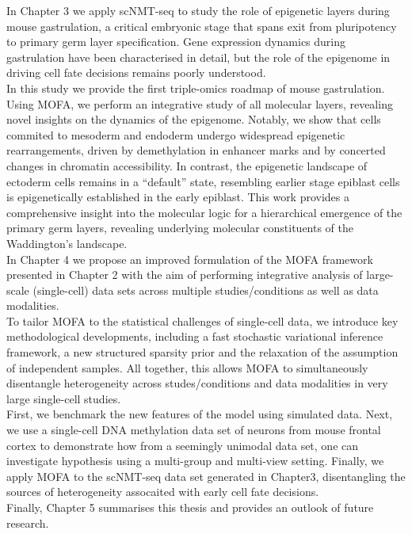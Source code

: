 In Chapter 3 we apply scNMT-seq to study the role of epigenetic layers during mouse gastrulation, a critical embryonic stage that spans exit from pluripotency to primary germ layer specification. Gene expression dynamics during gastrulation have been characterised in detail, but the role of the epigenome in driving cell fate decisions remains poorly understood.\\
In this study we provide the first triple-omics roadmap of mouse gastrulation. Using MOFA, we perform an integrative study of all molecular layers, revealing novel insights on the dynamics of the epigenome. Notably, we show that cells commited to mesoderm and endoderm undergo widespread epigenetic rearrangements, driven by demethylation in enhancer marks and by concerted changes in chromatin accessibility. In contrast, the epigenetic landscape of ectoderm cells remains in a “default” state, resembling earlier stage epiblast cells is epigenetically established in the early epiblast. This work provides a comprehensive insight into the molecular logic for a hierarchical emergence of the primary germ layers, revealing underlying molecular constituents of the Waddington's landscape.\\

In Chapter 4 we propose an improved formulation of the MOFA framework presented in Chapter 2 with the aim of performing integrative analysis of large-scale (single-cell) data sets across multiple studies/conditions as well as data modalities.\\
To tailor MOFA to the statistical challenges of single-cell data, we introduce key methodological developments, including a fast stochastic variational inference framework, a new structured sparsity prior and the relaxation of the assumption of independent samples. All together, this allows MOFA to simultaneously disentangle heterogeneity across studes/conditions and data modalities in very large single-cell studies.\\
First, we benchmark the new features of the model using simulated data. Next, we use a single-cell DNA methylation data set of neurons from mouse frontal cortex to demonstrate how from a seemingly unimodal data set, one can investigate hypothesis using a multi-group and multi-view setting. Finally, we apply MOFA to the scNMT-seq data set generated in Chapter3, disentangling the sources of heterogeneity assocaited with early cell fate decisions.\\

Finally, Chapter 5 summarises this thesis and provides an outlook of future research.